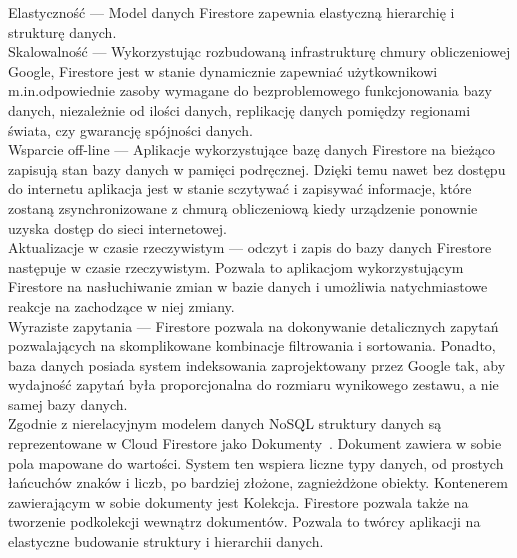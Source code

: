         \noindent Elastyczność — Model danych Firestore zapewnia elastyczną hierarchię i strukturę danych. \\
        
        \noindent Skalowalność — Wykorzystując rozbudowaną infrastrukturę chmury obliczeniowej Google, Firestore jest w stanie dynamicznie zapewniać użytkownikowi m.in.\@ odpowiednie zasoby
        wymagane do bezproblemowego funkcjonowania bazy danych, niezależnie od ilości danych, replikację danych pomiędzy regionami świata, czy gwarancję spójności danych.~\cite{FIRESTORE_SCALE} \\
        
        \noindent Wsparcie off-line — Aplikacje wykorzystujące bazę danych Firestore na bieżąco zapisują stan bazy danych w pamięci podręcznej. Dzięki temu nawet bez dostępu do internetu aplikacja 
        jest w stanie sczytywać i zapisywać informacje, które zostaną zsynchronizowane z chmurą obliczeniową kiedy urządzenie ponownie uzyska dostęp do sieci internetowej. \\
        
        \noindent Aktualizacje w czasie rzeczywistym — odczyt i zapis do bazy danych Firestore następuje w czasie rzeczywistym. Pozwala to aplikacjom wykorzystującym Firestore na nasłuchiwanie zmian 
        w bazie danych i umożliwia natychmiastowe reakcje na zachodzące w niej zmiany. \\

        \noindent Wyraziste zapytania — Firestore pozwala na dokonywanie detalicznych zapytań pozwalających na skomplikowane kombinacje filtrowania i sortowania. Ponadto, baza danych posiada
        system indeksowania zaprojektowany przez Google tak, aby wydajność zapytań była proporcjonalna do rozmiaru wynikowego zestawu, a nie samej bazy danych. \\ 

        Zgodnie z nierelacyjnym modelem danych NoSQL struktury danych są reprezentowane w Cloud Firestore jako Dokumenty~\cite{FIRESTORE_DOCS}. Dokument zawiera w sobie pola mapowane do wartości.
        System ten wspiera liczne typy danych, od prostych łańcuchów znaków i liczb, po bardziej złożone, zagnieżdżone obiekty. Kontenerem zawierającym w sobie dokumenty jest Kolekcja.
        Firestore pozwala także na tworzenie podkolekcji wewnątrz dokumentów. Pozwala to twórcy aplikacji na elastyczne budowanie struktury i hierarchii danych. \\


